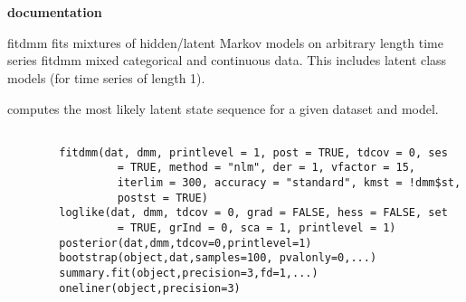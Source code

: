 \documentclass[a4paper]{book}
\begin{document}
\chapter*{}
\begin{center}
{\textbf{\huge \R{} documentation}} \par{}
\par\bigskip{\large \today}
\end{center}
\begin{Description}\relax
\item[fitdmm]  fits mixtures of hidden/latent Markov
models on arbitrary length time series fitdmm mixed categorical and
continuous data.  This includes latent class models (for time series of
length 1).

\item[\code{posterior}]  computes the most likely
latent state sequence for a given dataset and model.
\end{Description}
\begin{Usage}
\begin{verbatim}
        
        fitdmm(dat, dmm, printlevel = 1, post = TRUE, tdcov = 0, ses
                 = TRUE, method = "nlm", der = 1, vfactor = 15,
                 iterlim = 300, accuracy = "standard", kmst = !dmm$st,
                 postst = TRUE)
        loglike(dat, dmm, tdcov = 0, grad = FALSE, hess = FALSE, set
                 = TRUE, grInd = 0, sca = 1, printlevel = 1)
        posterior(dat,dmm,tdcov=0,printlevel=1)
        bootstrap(object,dat,samples=100, pvalonly=0,...)
        summary.fit(object,precision=3,fd=1,...)
        oneliner(object,precision=3)
        
\end{verbatim}
\end{Usage}
\end{document}

